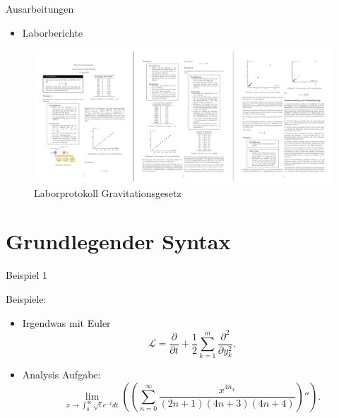 \documentclass{beamer}
\begin{document}
\begin{frame}{Ausarbeitungen}
    \begin{itemize}
        \item Laborberichte 
    \end{itemize}
    \begin{figure}[htpb]
        \centering
        \includegraphics[width=1\textwidth]{./figs/am stueck.png}
        \caption{Laborprotokoll Gravitationsgesetz}
        \label{fig:}
    \end{figure}

\end{frame}




\section{Grundlegender Syntax}
\begin{frame}{Beispiel 1}


Beispiele:
\begin{itemize}
    \item Irgendwas mit Euler \cite{baranek2023randomized}
        \[ \mathcal{L} = \frac{\partial}{\partial t}+ \frac{1}{2}\sum_{k=1}^{m}\frac{\partial^2}{\partial y_{k}^2} .\] 
\end{itemize}


\begin{itemize}
    \item Analysis Aufgabe: 
        \[ \lim_{x\to \int_0^{\infty} \sqrt{t}e^{-t}dt}\left( \left( \sum_{n=0}^{\infty}\frac{x^{4n_4}}{(2n+1)(4n+3)(4n+4)} \right)''  \right) .\] 
\end{itemize}
\end{frame}

    
\end{document}

